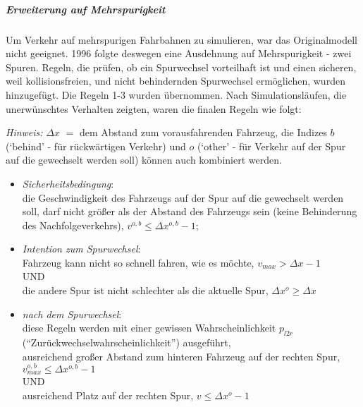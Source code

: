 \subparagraph{Erweiterung auf Mehrspurigkeit}

Um Verkehr auf mehrspurigen Fahrbahnen zu simulieren, war das Originalmodell nicht geeignet. 
1996 folgte deswegen eine Ausdehnung auf Mehrspurigkeit \cite{multi-lane} - zwei Spuren. 
Regeln, die prüfen, ob ein Spurwechsel vorteilhaft ist und einen sicheren, weil kollisionsfreien, und nicht behindernden Spurwechsel ermöglichen, wurden hinzugefügt. Die Regeln 1-3 wurden übernommen. Nach Simulationsläufen, die unerwünschtes Verhalten zeigten, waren die finalen Regeln wie folgt:

\textit{Hinweis:} $\Delta x$ $\widehat{=}$ dem Abstand zum vorausfahrenden Fahrzeug, die Indizes $b$ (\enquote*{behind} - für rückwärtigen Verkehr) und $o$ (\enquote*{other} - für Verkehr auf der Spur auf die gewechselt werden soll) können auch kombiniert werden. 

\begin{itemize}
	\item \textit{Sicherheitsbedingung}: 
	\\	
	die Geschwindigkeit des Fahrzeugs auf der Spur auf die gewechselt werden soll, darf nicht größer als der Abstand des Fahrzeugs sein (keine Behinderung des Nachfolgeverkehrs), $v^{o,b} \leq \Delta x^{o,b}-1$;
	\item \textit{Intention zum Spurwechsel}: 
	\\
	Fahrzeug kann nicht so schnell fahren, wie es möchte, $v_{max} > \Delta x-1$ \\
	UND\\
	die andere Spur ist nicht schlechter als die aktuelle Spur, $\Delta x^{o} \geq \Delta x$
	\item \textit{nach dem Spurwechsel}: 
	\\
	diese Regeln werden mit einer gewissen Wahrscheinlichkeit $p_{l2r}$ (\enquote{Zurückwechselwahrscheinlichkeit}) ausgeführt, \\
	ausreichend großer Abstand zum hinteren Fahrzeug auf der rechten Spur, $v^{o,b}_{max} \leq \Delta x^{o,b}-1$ \\
	UND \\
	ausreichend Platz auf der rechten Spur, $v \leq \Delta x^{o}-1$
\end{itemize}

